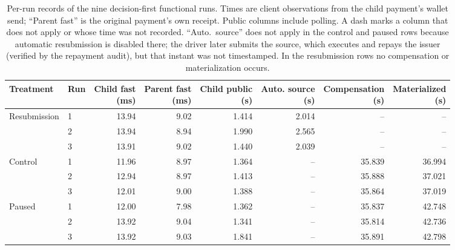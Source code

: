 \begin{table}[t]
  \caption{Per-run records of the nine decision-first functional runs.
    Times are client observations from the child payment's wallet send;
    ``Parent fast'' is the original payment's own receipt. Public columns
    include polling. A dash marks a column that does not apply or whose
    time was not recorded. ``Auto.\ source'' does not apply in the control
    and paused rows because automatic resubmission is disabled there; the
    driver later submits the source, which executes and repays the issuer
    (verified by the repayment audit), but that instant was not
    timestamped. In the resubmission rows no compensation or
    materialization occurs.}
  \label{tab:supp-functional}
  \centering
  \small
  \setlength{\tabcolsep}{4pt}
  \begin{tabular}{@{}llrrrrrr@{}}
    \toprule
    Treatment & Run & \shortstack{Child fast\\(ms)} & \shortstack{Parent fast\\(ms)}
      & \shortstack{Child public\\(s)} & \shortstack{Auto. source\\(s)} & \shortstack{Compensation\\(s)}
      & \shortstack{Materialized\\(s)} \\
    \midrule
    Resubmission & 1 & 13.94 & 9.02 & 1.414 & 2.014 & -- & -- \\
     & 2 & 13.94 & 8.94 & 1.990 & 2.565 & -- & -- \\
     & 3 & 13.91 & 9.02 & 1.440 & 2.039 & -- & -- \\
    \addlinespace
    Control & 1 & 11.96 & 8.97 & 1.364 & -- & 35.839 & 36.994 \\
     & 2 & 12.94 & 8.97 & 1.413 & -- & 35.888 & 37.021 \\
     & 3 & 12.01 & 9.00 & 1.388 & -- & 35.864 & 37.019 \\
    \addlinespace
    Paused & 1 & 12.00 & 7.98 & 1.362 & -- & 35.837 & 42.748 \\
     & 2 & 13.92 & 9.04 & 1.341 & -- & 35.814 & 42.736 \\
     & 3 & 13.92 & 9.03 & 1.841 & -- & 35.891 & 42.798 \\
    \bottomrule
  \end{tabular}
\end{table}

